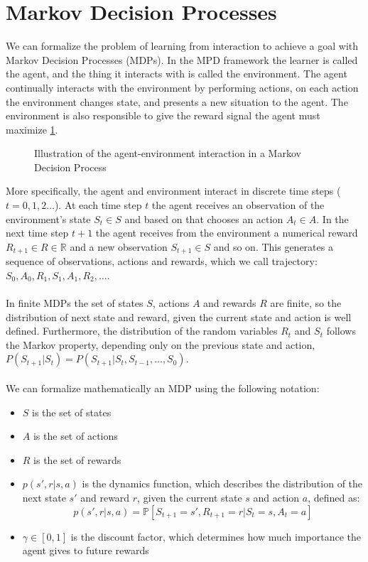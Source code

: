 \section{Markov Decision Processes}
We can formalize the problem of learning from interaction to achieve a goal with Markov Decision Processes (MDPs). In the MPD framework the learner is called the agent, and the thing it interacts with is called the environment. The agent continually interacts with the environment by performing actions, on each action the environment changes state, and presents a new situation to the agent. The environment is also responsible to give the reward signal the agent must maximize \ref{fig:mdp}.
\begin{figure}[H]
    \centering
    
    \caption{Illustration of the agent-environment interaction in a Markov Decision Process}
    \label{fig:mdp}
\end{figure}
More specifically, the agent and environment interact in discrete time steps ($t=0, 1, 2 \dots$). At each time step $t$ the agent receives an observation of the environment's state $S_t \in S$ and based on that chooses an action $A_t \in A$. In the next time step $t+1$ the agent receives from the environment a numerical reward $R_{t+1} \in R \in \mathbb{R}$ and a new observation $S_{t+1} \in S$ and so on. This generates a sequence of observations, actions and rewards, which we call trajectory: $S_0, A_0, R_1, S_1, A_1, R_2, \dots$.\\\\
In finite MDPs the set of states $S$, actions $A$ and rewards $R$ are finite, so the distribution of next state and reward, given the current state and action is well defined. Furthermore, the distribution of the random variables $R_t$ and $S_t$ follows the Markov property, depending only on the previous state and action, $P(S_{t+1}|S_t) = P(S_{t+1}|S_t, S_{t-1}, \dots, S_0)$.\\\\
We can formalize mathematically an MDP using the following notation:
\begin{itemize}
    \item $S$ is the set of states
    \item $A$ is the set of actions
    \item $R$ is the set of rewards
    \item $p(s', r | s, a)$ is the dynamics function, which describes the distribution of the next state $s'$ and reward $r$, given the current state $s$ and action $a$, defined as:
    \begin{equation}
        p(s', r | s, a) = \mathds{P}[S_{t+1} = s', R_{t+1} = r | S_t = s, A_t = a]
        \label{dynamics-function}
    \end{equation}
    \item $\gamma \in [0, 1]$ is the discount factor, which determines how much importance the agent gives to future rewards
\end{itemize}


